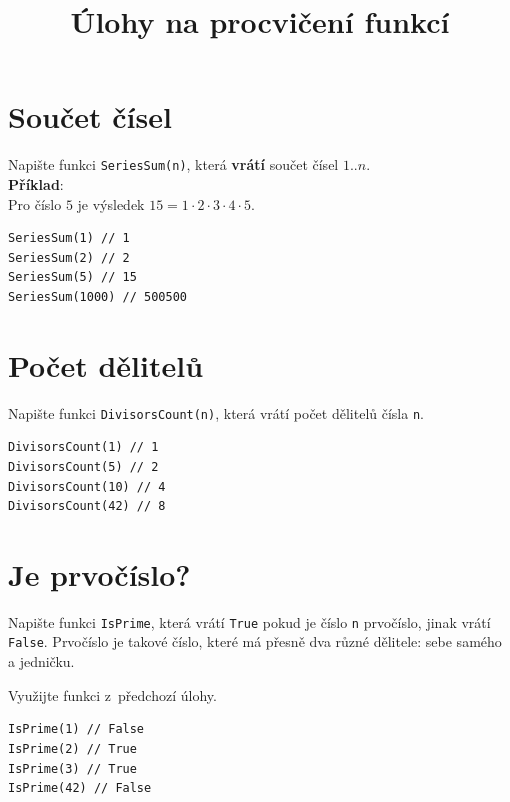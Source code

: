 \documentclass[12pt,a4paper]{article}
\begin{document}
\pagestyle{empty}
\title{Úlohy na procvičení funkcí}
\date{\vspace{-10ex}}
\setlength{\droptitle}{-6em}
\maketitle

\setlength\parindent{0pt}

\begin{multicols}{2}

\section{Součet čísel}

Napište funkci \texttt{SeriesSum(n)}, která \textbf{vrátí} součet čísel
$1..n$.\\

\textbf{Příklad}:\\
Pro číslo $5$ je výsledek $15 = 1 \cdot 2 \cdot 3 \cdot 4 \cdot 5$.

\begin{verbatim}
SeriesSum(1) // 1
SeriesSum(2) // 2
SeriesSum(5) // 15
SeriesSum(1000) // 500500
\end{verbatim}

\section{Počet dělitelů}

Napište funkci \texttt{DivisorsCount(n)}, která vrátí počet dělitelů čísla
\texttt{n}.

\begin{verbatim}
DivisorsCount(1) // 1
DivisorsCount(5) // 2
DivisorsCount(10) // 4
DivisorsCount(42) // 8
\end{verbatim}

\section{Je prvočíslo?}

Napište funkci \texttt{IsPrime}, která vrátí \texttt{True} pokud je číslo
\texttt{n} prvočíslo, jinak vrátí \texttt{False}. Prvočíslo je takové číslo,
které má přesně dva různé dělitele: sebe samého a jedničku.

Využijte funkci z~předchozí úlohy.

\begin{verbatim}
IsPrime(1) // False
IsPrime(2) // True
IsPrime(3) // True
IsPrime(42) // False
\end{verbatim}


\end{multicols}
\end{document}
